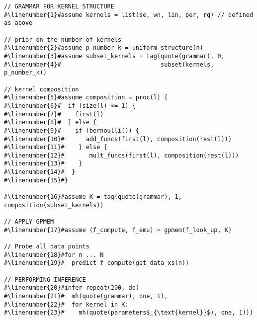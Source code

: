 \begin{mdframed}
\begin{minipage}{\linewidth}
\small
\belowcaptionskip=-10pt
\begin{lstlisting}[mathescape,label=alg:structureVent,basicstyle=\selectfont\ttfamily,numbers=none,escapechar=\#]
// GRAMMAR FOR KERNEL STRUCTURE
#\linenumber{1}#assume kernels = list(se, wn, lin, per, rq) // defined as above

// prior on the number of kernels
#\linenumber{2}#assume p_number_k = uniform_structure(n)
#\linenumber{3}#assume subset_kernels = tag(quote(grammar), 0,
#\linenumber{4}#                            subset(kernels, p_number_k))

// kernel composition
#\linenumber{5}#assume composition = proc(l) {
#\linenumber{6}#  if (size(l) <= 1) {
#\linenumber{7}#    first(l)
#\linenumber{8}#  } else {
#\linenumber{9}#    if (bernoulli()) {
#\linenumber{10}#      add_funcs(first(l), composition(rest(l)))
#\linenumber{11}#    } else {
#\linenumber{12}#       mult_funcs(first(l), composition(rest(l)))
#\linenumber{13}#    }
#\linenumber{14}#  }
#\linenumber{15}#}

#\linenumber{16}#assume K = tag(quote(grammar), 1, composition(subset_kernels))

// APPLY GPMEM
#\linenumber{17}#assume (f_compute, f_emu) = gpmem(f_look_up, K)

// Probe all data points
#\linenumber{18}#for n ... N
#\linenumber{19}#  predict f_compute(get_data_xs(n))

// PERFORMING INFERENCE
#\linenumber{20}#infer repeat(200, do(
#\linenumber{21}#  mh(quote(grammar), one, 1),
#\linenumber{22}#  for kernel in K:
#\linenumber{23}#    mh(quote(parameters$_{\text{kernel}}$), one, 1)))
\end{lstlisting}

\end{minipage}
\end{mdframed}
